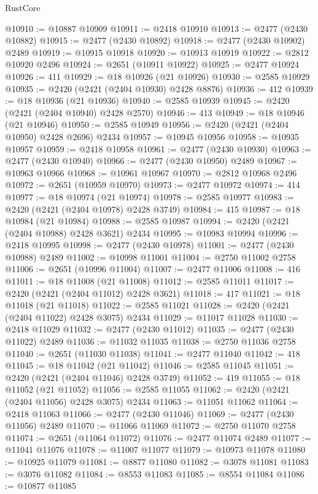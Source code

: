 \begin{lexlean}{RustCore}
\begin{coremodule}
@10910 := @10887 @10909
@10911 := @2418 @10910
@10913 := @2477 (@2430 @10882)
@10915 := @2477 (@2430 @10892)
@10918 := @2477 (@2430 @10902) @2489
@10919 := @10915 @10918
@10920 := @10913 @10919
@10922 := @2812 @10920 @2496
@10924 := @2651 (@10911 @10922)
@10925 := @2477 @10924
@10926 := 411
@10929 := @18 @10926 (@21 @10926)
@10930 := @2585 @10929
@10935 := @2420 (@2421 (@2404 @10930) @2428 @8876)
@10936 := 412
@10939 := @18 @10936 (@21 @10936)
@10940 := @2585 @10939
@10945 := @2420 (@2421 (@2404 @10940) @2428 @2570)
@10946 := 413
@10949 := @18 @10946 (@21 @10946)
@10950 := @2585 @10949
@10956 := @2420 (@2421 (@2404 @10950) @2428 @2696) @2434
@10957 := @10945 @10956
@10958 := @10935 @10957
@10959 := @2418 @10958
@10961 := @2477 (@2430 @10930)
@10963 := @2477 (@2430 @10940)
@10966 := @2477 (@2430 @10950) @2489
@10967 := @10963 @10966
@10968 := @10961 @10967
@10970 := @2812 @10968 @2496
@10972 := @2651 (@10959 @10970)
@10973 := @2477 @10972
@10974 := 414
@10977 := @18 @10974 (@21 @10974)
@10978 := @2585 @10977
@10983 := @2420 (@2421 (@2404 @10978) @2428 @3749)
@10984 := 415
@10987 := @18 @10984 (@21 @10984)
@10988 := @2585 @10987
@10994 := @2420 (@2421 (@2404 @10988) @2428 @3621) @2434
@10995 := @10983 @10994
@10996 := @2418 @10995
@10998 := @2477 (@2430 @10978)
@11001 := @2477 (@2430 @10988) @2489
@11002 := @10998 @11001
@11004 := @2750 @11002 @2758
@11006 := @2651 (@10996 @11004)
@11007 := @2477 @11006
@11008 := 416
@11011 := @18 @11008 (@21 @11008)
@11012 := @2585 @11011
@11017 := @2420 (@2421 (@2404 @11012) @2428 @3621)
@11018 := 417
@11021 := @18 @11018 (@21 @11018)
@11022 := @2585 @11021
@11028 := @2420 (@2421 (@2404 @11022) @2428 @3075) @2434
@11029 := @11017 @11028
@11030 := @2418 @11029
@11032 := @2477 (@2430 @11012)
@11035 := @2477 (@2430 @11022) @2489
@11036 := @11032 @11035
@11038 := @2750 @11036 @2758
@11040 := @2651 (@11030 @11038)
@11041 := @2477 @11040
@11042 := 418
@11045 := @18 @11042 (@21 @11042)
@11046 := @2585 @11045
@11051 := @2420 (@2421 (@2404 @11046) @2428 @3749)
@11052 := 419
@11055 := @18 @11052 (@21 @11052)
@11056 := @2585 @11055
@11062 := @2420 (@2421 (@2404 @11056) @2428 @3075) @2434
@11063 := @11051 @11062
@11064 := @2418 @11063
@11066 := @2477 (@2430 @11046)
@11069 := @2477 (@2430 @11056) @2489
@11070 := @11066 @11069
@11072 := @2750 @11070 @2758
@11074 := @2651 (@11064 @11072)
@11076 := @2477 @11074 @2489
@11077 := @11041 @11076
@11078 := @11007 @11077
@11079 := @10973 @11078
@11080 := @10925 @11079
@11081 := @8877 @11080
@11082 := @3078 @11081
@11083 := @3076 @11082
@11084 := @8553 @11083
@11085 := @8554 @11084
@11086 := @10877 @11085

\end{coremodule}
\end{lexlean}
